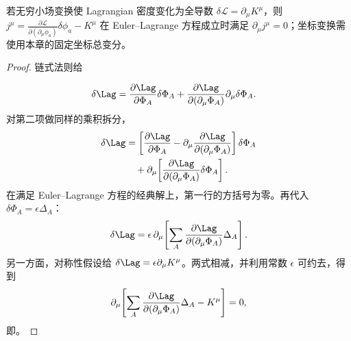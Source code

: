 \begin{theorem}
若无穷小场变换使 Lagrangian 密度变化为全导数 $\delta\mathcal L=\partial_\mu K^\mu$，则 $j^\mu=\frac{\partial\mathcal L}{\partial(\partial_\mu\phi_a)}\delta\phi_a-K^\mu$ 在 Euler--Lagrange 方程成立时满足 $\partial_\mu j^\mu=0$；坐标变换需使用本章的固定坐标总变分。
\end{theorem}
\begin{proof}
链式法则给

\begin{align*}
 \delta\Lag
 &=\frac{\partial\Lag}{\partial\Phi_A}\delta\Phi_A
 +\frac{\partial\Lag}{\partial(\partial_\mu\Phi_A)}
 \partial_\mu\delta\Phi_A.
\end{align*}
对第二项做同样的乘积拆分，
\begin{align*}
 \delta\Lag
 &=\left[
 \frac{\partial\Lag}{\partial\Phi_A}
 -\partial_\mu\frac{\partial\Lag}{\partial(\partial_\mu\Phi_A)}
 \right]\delta\Phi_A\\
 &\quad+\partial_\mu\!\left[
 \frac{\partial\Lag}{\partial(\partial_\mu\Phi_A)}
 \delta\Phi_A\right].
\end{align*}
在满足 Euler--Lagrange 方程的经典解上，第一行的方括号为零。再代入 $\delta\Phi_A=\epsilon\Delta_A$：
\begin{equation*}
 \delta\Lag
 =\epsilon\,\partial_\mu\!\left[
 \sum_A\frac{\partial\Lag}{\partial(\partial_\mu\Phi_A)}
 \Delta_A\right].
\end{equation*}
另一方面，对称性假设给 $\delta\Lag=\epsilon\partial_\mu K^\mu$。两式相减，并利用常数 $\epsilon$ 可约去，得到
\begin{equation*}
 \partial_\mu\!\left[
 \sum_A\frac{\partial\Lag}{\partial(\partial_\mu\Phi_A)}
 \Delta_A-K^\mu\right]=0,
\end{equation*}
即。
\end{proof}

